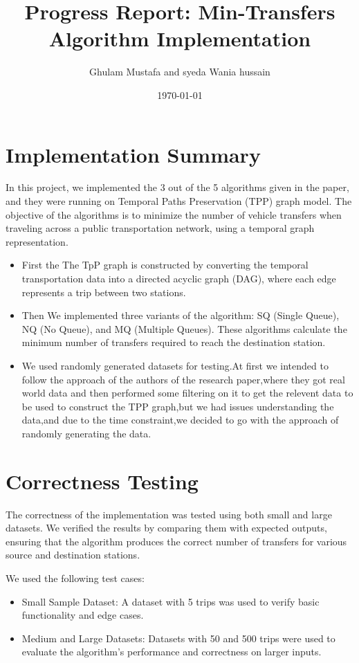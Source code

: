 \documentclass[12pt]{article}
\title{Progress Report: Min-Transfers Algorithm Implementation}
\author{Ghulam Mustafa and syeda Wania hussain}
\date{\today}
\begin{document}
\maketitle



\section{Implementation Summary}
In this project, we implemented the 3 out of the 5 algorithms given in the paper, and they were running on Temporal Paths Preservation (TPP) graph model. The objective of the algorithms is to minimize the number of vehicle transfers when traveling across a public transportation network, using a temporal graph representation.


\begin{itemize}
    \item First the  The TpP graph is constructed by converting the temporal transportation data into a directed acyclic graph (DAG), where each edge represents a trip between two stations.
    \item Then We implemented three variants of the algorithm: SQ (Single Queue), NQ (No Queue), and MQ (Multiple Queues). These algorithms calculate the minimum number of transfers required to reach the destination station.
    \item  We used randomly generated datasets for testing.At first we intended to follow the approach of the authors of the research paper,where they got real world data and then performed some filtering on it to get the relevent data to be used to construct the TPP graph,but we had issues understanding the data,and due to the time constraint,we decided to go with the approach of randomly generating the data.
\end{itemize}



\section{Correctness Testing}
The correctness of the implementation was tested using both small and large datasets. We verified the results by comparing them with expected outputs, ensuring that the algorithm produces the correct number of transfers for various source and destination stations.

We used the following test cases:
\begin{itemize}
    \item Small Sample Dataset: A dataset with 5 trips was used to verify basic functionality and edge cases.
    \item Medium and Large Datasets: Datasets with 50 and 500 trips were used to evaluate the algorithm's performance and correctness on larger inputs.
\end{itemize}
\end{document}
